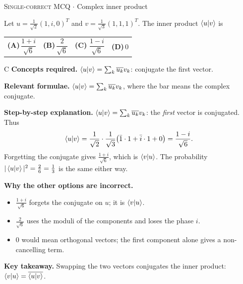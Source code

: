 \documentclass[11pt,a4paper]{article}
\newcommand{\optlabel}[1]{\textbf{(#1)}}
\newcommand{\correctlabel}[1]{\textcolor{okgreen}{\textbf{(#1)}\,\ding{51}}}
\newenvironment{qitem}[1]{\begin{list}{}{\setlength{\leftmargin}{3.3em}\setlength{\labelwidth}{3.1em}%
  \setlength{\labelsep}{0.2em}\setlength{\topsep}{3pt}\setlength{\parsep}{3pt}}\item[\textbf{Q.#1}\hfill]}{\end{list}}
\newcommand{\qsep}{\par\vspace{2pt}{\color{black!15}\hrule}\vspace{4pt}}
\newcommand{\qmeta}[2]{{\footnotesize\color{black!60}\textsc{#1} \;$\cdot$\; #2}\par}
\begin{document}
\begin{qitem}{14}
\qmeta{Single-correct MCQ}{Complex inner product}
Let $u = \frac{1}{\sqrt2}(1, i, 0)^{T}$ and $v = \frac{1}{\sqrt3}(1, 1, 1)^{T}$. The inner product $\braket{u|v}$ is
\par\smallskip\noindent\begin{tabularx}{\linewidth}{@{}*{4}{L}@{}}
\optlabel{A}\,$\dfrac{1 + i}{\sqrt6}$ & \optlabel{B}\,$\dfrac{2}{\sqrt6}$ & \correctlabel{C}\,$\dfrac{1 - i}{\sqrt6}$ & \optlabel{D}\,$0$
\end{tabularx}
\end{qitem}
\begin{solbox}{C}
\textbf{\color{brand}Concepts required.} $\braket{u|v} = \sum_k\overline{u_k}v_k$: conjugate the first vector.

\textbf{\color{brand}Relevant formulae.} $\braket{u|v} = \sum_k\overline{u_k}v_k$, where the bar means the complex conjugate.

\textbf{\color{brand}Step-by-step explanation.} $\braket{u|v} = \sum_k \overline{u_k}v_k$: the \emph{first} vector is conjugated. Thus
\[ \braket{u|v} = \frac{1}{\sqrt2}\cdot\frac{1}{\sqrt3}\big(\bar1\cdot1 + \bar i\cdot1 + 0\big) = \frac{1 - i}{\sqrt6}. \]
Forgetting the conjugate gives $\frac{1 + i}{\sqrt6}$, which is $\braket{v|u}$. The probability $|\braket{u|v}|^2 = \frac{2}{6} = \frac13$ is the same either way.

\textbf{\color{brand}Why the other options are incorrect.}
\begin{itemize}[leftmargin=2.4em, itemsep=1pt, topsep=2pt]
\item[\textbf{(A)}] $\frac{1 + i}{\sqrt6}$ forgets the conjugate on $u$; it is $\braket{v|u}$.
\item[\textbf{(B)}] $\frac{2}{\sqrt6}$ uses the moduli of the components and loses the phase $i$.
\item[\textbf{(D)}] $0$ would mean orthogonal vectors; the first component alone gives a non-cancelling term.
\end{itemize}
\textbf{\color{brand}Key takeaway.} Swapping the two vectors conjugates the inner product: $\braket{v|u} = \overline{\braket{u|v}}$.
\end{solbox}
\qsep
\end{document}
